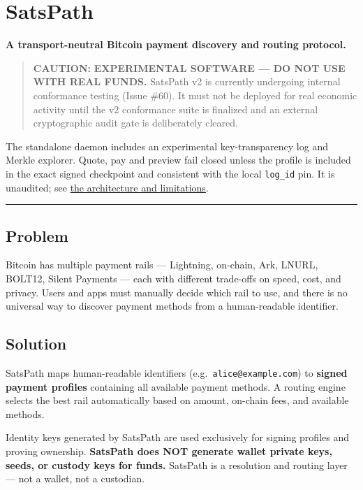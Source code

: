 \documentclass[
]{article}
\author{}
\date{}
\begin{document}
\hypertarget{satspath}{%
\section{SatsPath}\label{satspath}}

\textbf{A transport-neutral Bitcoin payment discovery and routing
protocol.}

\begin{quote}
\textbf{CAUTION:} \textbf{EXPERIMENTAL SOFTWARE --- DO NOT USE WITH REAL
FUNDS.} SatsPath v2 is currently undergoing internal conformance testing
(Issue \#60). It must not be deployed for real economic activity until
the v2 conformance suite is finalized and an external cryptographic
audit gate is deliberately cleared.
\end{quote}

The standalone daemon includes an experimental key-transparency log and
Merkle explorer. Quote, pay and preview fail closed unless the profile
is included in the exact signed checkpoint and consistent with the local
\texttt{log\_id} pin. It is unaudited; see
\href{docs/key_transparency.md}{the architecture and limitations}.

\begin{center}\rule{0.5\linewidth}{0.5pt}\end{center}

\hypertarget{problem}{%
\subsection{Problem}\label{problem}}

Bitcoin has multiple payment rails --- Lightning, on-chain, Ark, LNURL,
BOLT12, Silent Payments --- each with different trade-offs on speed,
cost, and privacy. Users and apps must manually decide which rail to
use, and there is no universal way to discover payment methods from a
human-readable identifier.

\hypertarget{solution}{%
\subsection{Solution}\label{solution}}

SatsPath maps human-readable identifiers
(e.g.~\texttt{alice@example.com}) to \textbf{signed payment profiles}
containing all available payment methods. A routing engine selects the
best rail automatically based on amount, on-chain fees, and available
methods.

Identity keys generated by SatsPath are used exclusively for signing
profiles and proving ownership. \textbf{SatsPath does NOT generate
wallet private keys, seeds, or custody keys for funds.} SatsPath is a
resolution and routing layer --- not a wallet, not a custodian.
\end{document}
